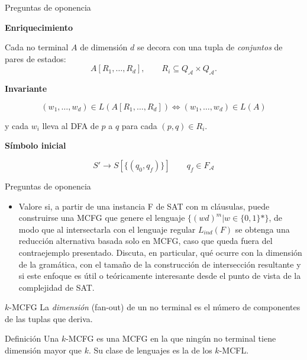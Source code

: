 \documentclass{beamer}
\newcommand{\repeatlang}{L_{0,1,d}}
\begin{document}
\begin{frame}{Preguntas de oponencia}

    \textbf{Enriquecimiento}

    Cada no terminal \(A\) de dimensión \(d\) se decora con una tupla de
    \emph{conjuntos} de pares de estados:
    \[
        A[R_1,\ldots,R_d],
        \qquad R_i \subseteq Q_{\mathcal A}\times Q_{\mathcal A}.
    \]

    \pause

    \textbf{Invariante}

    \[
        (w_1,\ldots,w_d)\in L(A[R_1,\ldots,R_d])
        \Longleftrightarrow
        (w_1,\ldots,w_d)\in L(A)
    \]
    \begin{center}
        y cada \(w_i\) lleva al DFA de \(p\) a \(q\) para cada \((p,q)\in R_i\).
    \end{center}

    \pause

    \textbf{Símbolo inicial}

    \[
        S' \rightarrow S[\{(q_0,q_f)\}]
        \qquad q_f \in F_{\mathcal A}
    \]

\end{frame}

\begin{frame}{Preguntas de oponencia}
    \begin{itemize}
        \item Valore si, a partir de una instancia F de SAT con m cláusulas, puede construirse una MCFG que genere el lenguaje $\{(wd)^m | w \in \{0,1\}*\}$, de modo que al intersectarla con el lenguaje regular $L_{ind}(F)$ se obtenga una reducción alternativa basada solo en MCFG, caso que queda fuera del contraejemplo presentado. Discuta, en particular, qué ocurre con la dimensión de la gramática, con el tamaño de la construcción de intersección resultante y si este enfoque es útil o teóricamente interesante desde el punto de vista de la complejidad de SAT.

    \end{itemize}
\end{frame}


\begin{frame}{$k$-MCFG}
    La \emph{dimensión} (fan-out) de un no terminal es el número de
    componentes de las tuplas que deriva.

    \pause
    \begin{block}{Definición}
        Una \(k\)-MCFG es una MCFG en la que ningún no terminal tiene
        dimensión mayor que \(k\). Su clase de lenguajes es la de los
        \(k\)-MCFL.
    \end{block}
\end{frame}
\end{document}
